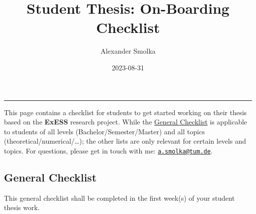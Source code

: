 \documentclass[
  letterpaper,
  DIV=11,
  numbers=noendperiod]{scrartcl}
\title{Student Thesis: On-Boarding Checklist}
\author{Alexander Smolka}
\date{2023-08-31}
\begin{document}
\maketitle
\ifdefined\Shaded\renewenvironment{Shaded}{\begin{tcolorbox}[borderline west={3pt}{0pt}{shadecolor}, frame hidden, boxrule=0pt, sharp corners, interior hidden, enhanced, breakable]}{\end{tcolorbox}}\fi

\begin{center}\rule{0.5\linewidth}{0.5pt}\end{center}

This page contains a checklist for students to get started working on
their thesis based on the \textbf{ExESS} research project. While the
\protect\hyperlink{sec-general}{General Checklist} is applicable to
students of all levels (Bachelor/Semester/Master) and all topics
(theoretical/numerical/\ldots); the other lists are only relevant for
certain levels and topics. For questions, please get in touch with me:
\href{mailto:a.smolka@tum.de}{\nolinkurl{a.smolka@tum.de}}.

\hypertarget{sec-general}{%
\subsection{General Checklist}\label{sec-general}}

This general checklist shall be completed in the first week(s) of your
student thesis work.
\end{document}
